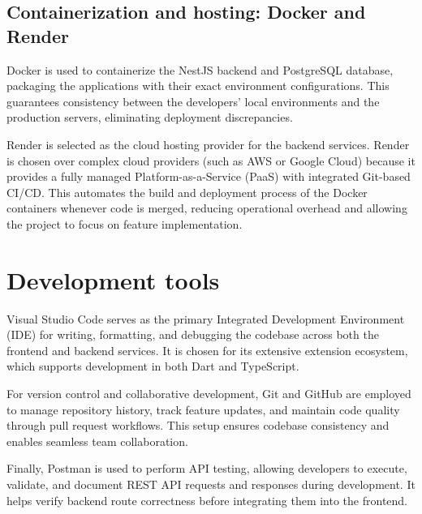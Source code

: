 \documentclass[../Main.tex]{subfiles}
\begin{document}
\subsection{Containerization and hosting: Docker and Render}
Docker \cite{dockerwebsite} is used to containerize the NestJS backend and PostgreSQL database, packaging the applications with their exact environment configurations. This guarantees consistency between the developers' local environments and the production servers, eliminating deployment discrepancies.

Render \cite{renderwebsite} is selected as the cloud hosting provider for the backend services. Render is chosen over complex cloud providers (such as AWS or Google Cloud) because it provides a fully managed Platform-as-a-Service (PaaS) with integrated Git-based CI/CD. This automates the build and deployment process of the Docker containers whenever code is merged, reducing operational overhead and allowing the project to focus on feature implementation.

\section{Development tools}

Visual Studio Code \cite{vscodewebsite} serves as the primary Integrated Development Environment (IDE) for writing, formatting, and debugging the codebase across both the frontend and backend services. It is chosen for its extensive extension ecosystem, which supports development in both Dart and TypeScript.

For version control and collaborative development, Git \cite{gitwebsite} and GitHub \cite{githubwebsite} are employed to manage repository history, track feature updates, and maintain code quality through pull request workflows. This setup ensures codebase consistency and enables seamless team collaboration.

Finally, Postman \cite{postmanwebsite} is used to perform API testing, allowing developers to execute, validate, and document REST API requests and responses during development. It helps verify backend route correctness before integrating them into the frontend.
\end{document}
